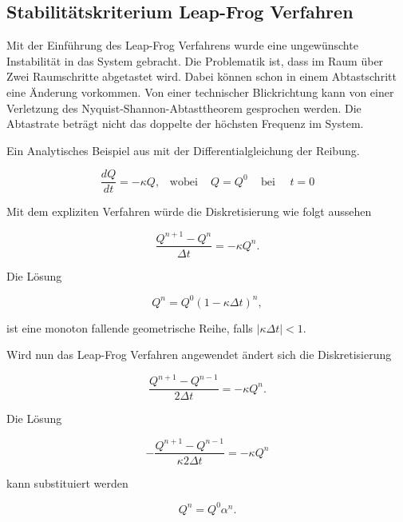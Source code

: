\subsection{Stabilit\"atskriterium Leap-Frog Verfahren}
	Mit der Einf\"uhrung des Leap-Frog Verfahrens wurde eine ungew\"unschte Instabilit\"at in das System gebracht.
	Die Problematik ist, dass im Raum über Zwei Raumschritte abgetastet wird.
	Dabei können schon in einem Abtastschritt eine Änderung vorkommen.
	Von einer technischer Blickrichtung kann von einer Verletzung des Nyquist-Shannon-Abtasttheorem gesprochen werden.
	Die Abtastrate beträgt nicht das doppelte der höchsten Frequenz im System.

	
	Ein Analytisches Beispiel aus \cite{burgers:lynch_2014} mit der Differentialgleichung der Reibung.
	
	\begin{equation}
		\frac{dQ}{dt} = - \kappa Q, \,\,\,\,\, \text{wobei} \, \,\,\,\,\,\, Q=Q^0 \,\,\,\,\,\,\, \text{bei} \,\,\,\,\,\,\,\, t=0
	\end{equation}

	Mit dem expliziten Verfahren w\"urde die Diskretisierung wie folgt aussehen
	
	\begin{equation}
		\frac{Q^{n+1}-Q^n}{\Delta t} = - \kappa Q^n.
	\end{equation}

	Die L\"osung
	
		\begin{equation}
			Q^n = Q^0(1-\kappa \Delta t)^n,
		\end{equation}
		
	ist eine monoton fallende geometrische Reihe, falls $|\kappa \Delta t| <1$.
	
	\medskip
	
	Wird nun das Leap-Frog Verfahren angewendet \"andert sich die Diskretisierung
	
	\begin{equation}
		\frac{Q^{n+1}-Q^{n-1}}{2 \Delta t} = - \kappa Q^n.
	\end{equation}

	Die L\"osung 
	
	\begin{equation}
		-\frac{Q^{n+1}-Q^{n-1}}{\kappa 2 \Delta t} = - \kappa Q^n
	\end{equation}

	kann substituiert werden
	
		\begin{equation}
			Q^n = Q^0\alpha ^n.
			\label{burgers:eq_cm}
		\end{equation}
	
